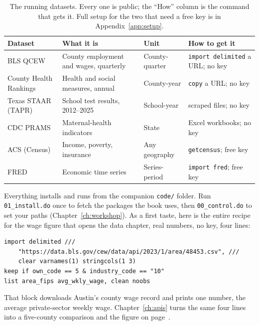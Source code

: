\documentclass[
    a4paper,
    fontsize=10pt,
    twoside=true,
    numbers=noenddot,
]{kaobook}
\begin{document}
\begin{table}[htbp]
\centering
\footnotesize
\caption[The book's running datasets]{The running datasets. Every one is public; the ``How'' column is the command that gets it. Full setup for the two that need a free key is in Appendix~\ref{app:setup}.}
\label{tab:data}
\begin{tabular}{@{}p{2.5cm}p{3.4cm}p{2.1cm}p{3.0cm}@{}}
\hline
\textbf{Dataset} & \textbf{What it is} & \textbf{Unit} & \textbf{How to get it} \\
\hline
BLS QCEW & County employment and wages, quarterly & County-quarter & \texttt{import delimited} a URL; no key \\
County Health Rankings & Health and social measures, annual & County-year & \texttt{copy} a URL; no key \\
Texas STAAR (TAPR) & School test results, 2012--2025 & School-year & scraped files; no key \\
CDC PRAMS & Maternal-health indicators & State & Excel workbooks; no key \\
ACS (Census) & Income, poverty, insurance & Any geography & \texttt{getcensus}; free key \\
FRED & Economic time series & Series-period & \texttt{import fred}; free key \\
\hline
\end{tabular}
\end{table}

Everything installs and runs from the companion \texttt{code/} folder. Run \texttt{01\_install.do} once to fetch the packages the book uses, then \texttt{00\_control.do} to set your paths (Chapter~\ref{ch:workshop}). As a first taste, here is the entire recipe for the wage figure that opens the data chapter, real numbers, no key, four lines:
{\footnotesize
\begin{verbatim}
import delimited ///
    "https://data.bls.gov/cew/data/api/2023/1/area/48453.csv", ///
    clear varnames(1) stringcols(1 3)
keep if own_code == 5 & industry_code == "10"
list area_fips avg_wkly_wage, clean noobs
\end{verbatim}
}
That block downloads Austin's county wage record and prints one number, the average private-sector weekly wage. Chapter~\ref{ch:apis} turns the same four lines into a five-county comparison and the figure on page~\pageref{fig:qcew}.
\end{document}
